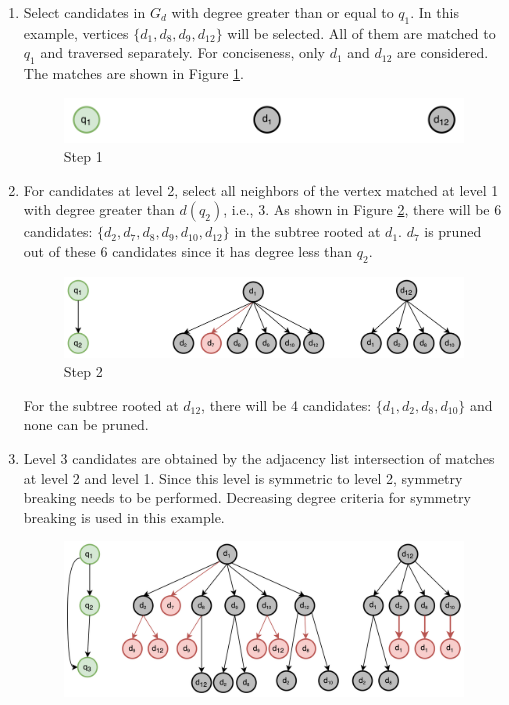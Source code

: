 \begin{enumerate}[Step 1:]
    \item Select candidates in $G_d$ with degree greater than or equal to $q_1$. In this example, vertices $\{d_1, d_8, d_9, d_{12}\}$ will be selected. All of them are matched to $q_1$ and traversed separately. For conciseness, only $d_1$ and $d_{12}$ are considered. The matches are shown in Figure \ref{fig:sgm-step1}.
          \begin{figure}
              \includegraphics[width=\textwidth]{fig/LR/sgm-step1.png}
              \caption{Step 1}
              \label{fig:sgm-step1}
          \end{figure}
    \item For candidates at level 2, select all neighbors of the vertex matched at level 1 with degree greater than $d(q_2)$, i.e., 3. As shown in Figure \ref{fig:sgm-step2}, there will be 6 candidates: $\{d_2, d_7, d_8, d_9, d_{10}, d_{12}\}$ in the subtree rooted at $d_1$. 
    $d_7$ is pruned out of these 6 candidates since it has degree less than $q_2$.\\
          \begin{figure}
              \includegraphics[width=\textwidth]{fig/LR/sgm-step2.png}
              \caption{Step 2}
              \label{fig:sgm-step2}
          \end{figure}
          For the subtree rooted at $d_{12}$, there will be 4 candidates: $\{d_1, d_2, d_8, d_{10}\}$ and none can be pruned.
    \item Level 3 candidates are obtained by the adjacency list intersection of matches at level 2 and level 1. 
    Since this level is symmetric to level 2, symmetry breaking needs to be performed. Decreasing degree criteria for symmetry breaking is used in this example.
          \begin{figure}
              \includegraphics[width=\textwidth]{fig/LR/sgm-step3.png}

\end{figure}
\end{enumerate}
